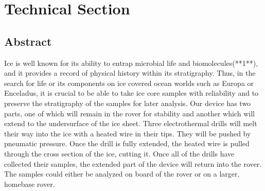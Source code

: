 \documentclass{article}
\begin{document}
\begin{titlepage}
\tableofcontents
\end{titlepage}

\section{Technical Section}
\subsection{Abstract}
Ice is well known for its ability to entrap microbial life and biomolecules(**1**), and it provides a record of physical history within its stratigraphy. Thus, in the search for life or its components on ice covered ocean worlds such as Europa or Enceladus, it is crucial to be able to take ice core samples with reliability and to preserve the stratigraphy of the samples for later analysis. Our device has two parts, one of which will remain in the rover for stability and another which will extend to the undersurface of the ice sheet. Three electrothermal drills will melt their way into the ice with a heated wire in their tips. They will be pushed by pneumatic pressure. Once the drill is fully extended, the heated wire is pulled through the cross section of the ice, cutting it. Once all of the drills have collected their samples, the extended part of the device will return into the rover. The samples could either be analyzed on board of the rover or on a larger, homebase rover.
\end{document}
